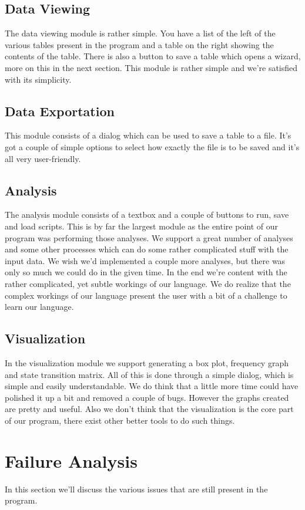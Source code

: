 \subsection{Data Viewing}
The data viewing module is rather simple. You have a list of the left of the various tables present in the program and a table on the right showing the contents of the table. There is also a button to save a table which opens a wizard, more on this in the next section. This module is rather simple and we're satisfied with its simplicity.

\subsection{Data Exportation}
This module consists of a dialog which can be used to save a table to a file. It's got a couple of simple options to select how exactly the file is to be saved and it's all very user-friendly.

\subsection{Analysis}
The analysis module consists of a textbox and a couple of buttons to run, save and load scripts. This is by far the largest module as the entire point of our program was performing those analyses. We support a great number of analyses and some other processes which can do some rather complicated stuff with the input data. We wish we'd implemented a couple more analyses, but there was only so much we could do in the given time. In the end we're content with the rather complicated, yet subtle workings of our language. We do realize that the complex workings of our language present the user with a bit of a challenge to learn our language.

\subsection{Visualization}
In the visualization module we support generating a box plot, frequency graph and state transition matrix. All of this is done through a simple dialog, which is simple and easily understandable. We do think that a little more time could have polished it up a bit and removed a couple of bugs. However the graphs created are pretty and useful. Also we don't think that the visualization is the core part of our program, there exist other better tools to do such things.

\section{Failure Analysis}
In this section we'll discuss the various issues that are still present in the program.

